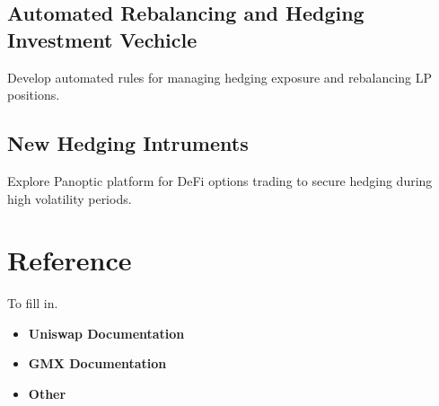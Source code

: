 \documentclass[12pt]{article}
\begin{document}
\subsection{Automated Rebalancing and Hedging Investment Vechicle}
Develop automated rules for managing hedging exposure and rebalancing LP positions.

\subsection{New Hedging Intruments}
Explore Panoptic platform for DeFi options trading to secure hedging during high volatility periods.

\newpage

\section{Reference}
\label{sec:ref}
To fill in.
\begin{itemize}
	\item \textbf{Uniswap Documentation}
	\item \textbf{GMX Documentation}
	\item \textbf{Other}
\end{itemize}
\end{document}
